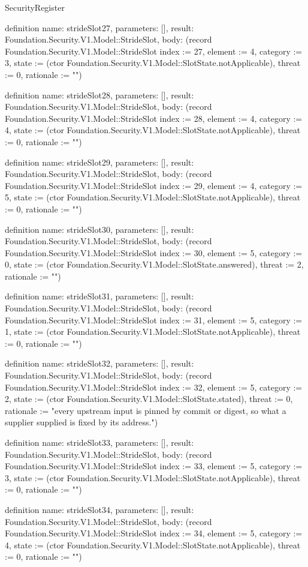 \begin{lexlean}{SecurityRegister}
\begin{semanticmodule}
definition{
  name: strideSlot27,
  parameters: [],
  result: Foundation.Security.V1.Model::StrideSlot,
  body: (record Foundation.Security.V1.Model::StrideSlot {index := 27, element := 4, category := 3, state := (ctor Foundation.Security.V1.Model::SlotState.notApplicable), threat := 0, rationale := ""})
}

definition{
  name: strideSlot28,
  parameters: [],
  result: Foundation.Security.V1.Model::StrideSlot,
  body: (record Foundation.Security.V1.Model::StrideSlot {index := 28, element := 4, category := 4, state := (ctor Foundation.Security.V1.Model::SlotState.notApplicable), threat := 0, rationale := ""})
}

definition{
  name: strideSlot29,
  parameters: [],
  result: Foundation.Security.V1.Model::StrideSlot,
  body: (record Foundation.Security.V1.Model::StrideSlot {index := 29, element := 4, category := 5, state := (ctor Foundation.Security.V1.Model::SlotState.notApplicable), threat := 0, rationale := ""})
}

definition{
  name: strideSlot30,
  parameters: [],
  result: Foundation.Security.V1.Model::StrideSlot,
  body: (record Foundation.Security.V1.Model::StrideSlot {index := 30, element := 5, category := 0, state := (ctor Foundation.Security.V1.Model::SlotState.answered), threat := 2, rationale := ""})
}

definition{
  name: strideSlot31,
  parameters: [],
  result: Foundation.Security.V1.Model::StrideSlot,
  body: (record Foundation.Security.V1.Model::StrideSlot {index := 31, element := 5, category := 1, state := (ctor Foundation.Security.V1.Model::SlotState.notApplicable), threat := 0, rationale := ""})
}

definition{
  name: strideSlot32,
  parameters: [],
  result: Foundation.Security.V1.Model::StrideSlot,
  body: (record Foundation.Security.V1.Model::StrideSlot {index := 32, element := 5, category := 2, state := (ctor Foundation.Security.V1.Model::SlotState.stated), threat := 0, rationale := "every upstream input is pinned by commit or digest, so what a supplier supplied is fixed by its address."})
}

definition{
  name: strideSlot33,
  parameters: [],
  result: Foundation.Security.V1.Model::StrideSlot,
  body: (record Foundation.Security.V1.Model::StrideSlot {index := 33, element := 5, category := 3, state := (ctor Foundation.Security.V1.Model::SlotState.notApplicable), threat := 0, rationale := ""})
}

definition{
  name: strideSlot34,
  parameters: [],
  result: Foundation.Security.V1.Model::StrideSlot,
  body: (record Foundation.Security.V1.Model::StrideSlot {index := 34, element := 5, category := 4, state := (ctor Foundation.Security.V1.Model::SlotState.notApplicable), threat := 0, rationale := ""})
}


\end{semanticmodule}
\end{lexlean}
